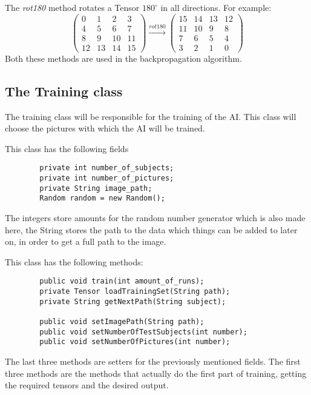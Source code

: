 \documentclass[12pt, titlepage]{article}
\begin{document}
		The \textit{rot180} method rotates a Tensor $180^\circ$ in all directions. For example:
		\begin{equation*}
		\begin{pmatrix}
		0 &1 &2 &3\\
		4 &5 &6 &7\\
		8 &9 &10 &11\\
		12 &13 &14 &15
		\end{pmatrix}\stackrel{rot180}{\longrightarrow} \begin{pmatrix}
		15 &14 &13 &12\\
		11 &10 &9 &8\\
		7 &6 &5 &4\\
		3 &2 &1 &0
		\end{pmatrix}
		\end{equation*}
		Both these methods are used in the backpropagation algorithm.
		
		\subsection{The Training class}
		The training class will be responsible for the training of the AI. This class will choose the pictures with which the AI will be trained.
		
		This class has the following fields
		\begin{lstlisting}
		private int number_of_subjects;
		private int number_of_pictures;
		private String image_path;
		Random random = new Random();
		\end{lstlisting}
		
		The integers store amounts for the random number generator which is also made here, the String stores the path to the data which things can be added to later on, in order to get a full path to the image.
		
		This class has the following methods:
		\begin{lstlisting}
		public void train(int amount_of_runs);
		private Tensor loadTrainingSet(String path);
		private String getNextPath(String subject);
		
		public void setImagePath(String path);
		public void setNumberOfTestSubjects(int number);
		public void setNumberOfPictures(int number);
		\end{lstlisting}
		
		The last three methods are setters for the previously mentioned fields. The first three methods are the methods that actually do the first part of training, getting the required tensors and the desired output.
		
\end{document}
